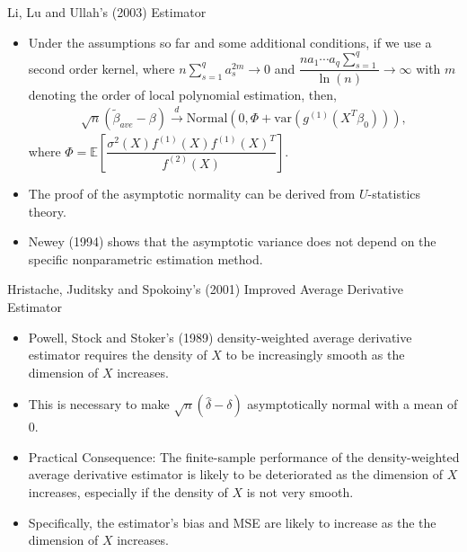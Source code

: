 \documentclass[xcolor=svgnames,dvipdfmx,cjk]{beamer}
\theoremstyle{example}
\def\var{\text{var}}
\def\E{\mathbb{E}}
\def\darrow{\xrightarrow{d}}
\begin{document}
\begin{frame}{Li, Lu and Ullah's (2003) Estimator}
\begin{itemize}
  \item Under the assumptions so far and some additional conditions, 
        if we use a second order kernel, 
        where $n\displaystyle\sum_{s=1}^{q} a_s^{2m} \to 0$ 
        and $\dfrac{n a_1 \cdots a_q \sum_{s=1}^{q}}{\ln (n)} \to \infty$ 
        with $m$ denoting the order of local polynomial estimation, then,
        \begin{align*}
          \sqrt{n} (\tilde{\beta}_{ave} - \beta) 
          \darrow \text{Normal}\left(0, \Phi + \var(g^{(1)}(X^{T}\beta_0)) \right),
        \end{align*} 
        where $\Phi = \E \left[ \dfrac{\sigma^2(X) f^{(1)}(X) f^{(1)}(X)^T}{f^{(2)}(X)} \right]$.
  \item The proof of the asymptotic normality can be derived from $U$-statistics theory.
  \item Newey (1994) shows that the asymptotic variance does not depend on the specific nonparametric estimation method.
\end{itemize}  
\end{frame}

\begin{frame}{Hristache, Juditsky and Spokoiny's (2001) Improved Average Derivative Estimator}
\begin{itemize}
  \item Powell, Stock and Stoker's (1989) density-weighted average derivative estimator requires 
        the density of $X$ to be increasingly smooth as the dimension of $X$ increases.
  \item This is necessary to make $\sqrt{n}(\hat{\delta} - \delta)$ asymptotically normal with a mean of 0.
  \item \alert{Practical Consequence}: The finite-sample performance of the density-weighted average derivative estimator
        is likely to be deteriorated as the dimension of $X$ increases, 
        especially if the density of $X$ is not very smooth.
  \item Specifically, the estimator's bias and MSE are likely to increase as the the dimension of $X$ increases.
\end{itemize}
\end{frame}
\end{document}
